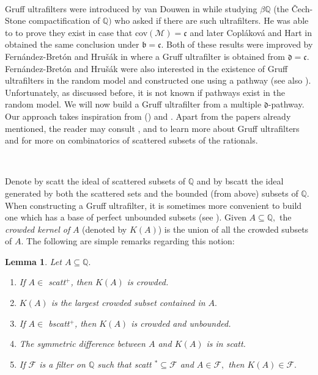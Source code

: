 \documentclass{article}%
\newtheorem{lemma}[theorem]{Lemma}
\begin{document}
\qquad\ \ \ 

Gruff ultrafilters were introduced by van Douwen in \cite{gruffvanDouwen}
while studying $\beta\mathbb{Q}$ (the \v{C}ech-Stone compactification of
$\mathbb{Q})$ who asked if there are such ultrafilters. He was able to to
prove they exist in case that \textsf{cov}$\left(  \mathcal{M}\right)
=\mathfrak{c}$ and later Copl\'{a}kov\'{a} and Hart in \cite{Hart} obtained
the same conclusion under $\mathfrak{b=c}.$ Both of these results were
improved by Fern\'{a}ndez-Bret\'{o}n and Hru\v{s}\'{a}k in
\cite{GruffUltrafilters} where a Gruff ultrafilter is obtained from
$\mathfrak{d=c}.$ Fern\'{a}ndez-Bret\'{o}n and Hru\v{s}\'{a}k were also
interested in the existence of Gruff ultrafilters in the random model and
constructed one using a pathway (see also \cite{GeneralizedPathways}).
Unfortunately, as discussed before, it is not known if pathways exist in the
random model. We will now build a Gruff ultrafilter from a multiple
$\mathfrak{d}$-pathway. Our approach takes inspiration from
\cite{GruffUltrafilters} (\cite{GeneralizedPathways}) and
\cite{PFiltersCohenRandomLaver}. Apart from the papers already mentioned, the
reader may consult \cite{GruffEmmanuel}, \cite{CPAbook} and \cite{GruffCPA} to
learn more about Gruff ultrafilters and \cite{irr} for more on combinatorics
of scattered subsets of the rationals.

\qquad\ \ \qquad\ \ 

Denote by \textsf{scatt }the ideal of scattered subsets of $\mathbb{Q}$ and by
\textsf{bscatt }the ideal generated by both the scattered sets and the bounded
(from above) subsets of $\mathbb{Q}.$ When constructing a Gruff ultrafilter,
it is sometimes more convenient to build one which has a base of perfect
unbounded subsets (see \cite{GruffUltrafilters}). Given $A\subseteq
\mathbb{Q},$ the \emph{crowded kernel of} $A$ (denoted by $K\left(  A\right)
$) is the union of all the crowded subsets of $A.$ The following are simple
remarks regarding this notion:

\begin{lemma}
Let $A\subseteq\mathbb{Q}.$ \label{prop basicas scatt}

\begin{enumerate}
\item If $A\in$ \textsf{scatt}$^{+}$, then $K\left(  A\right)  $ is crowded.

\item $K\left(  A\right)  $ is the largest crowded subset contained in $A.$

\item If $A\in$ \textsf{bscatt}$^{+}$, then $K\left(  A\right)  $ is crowded
and unbounded.

\item The symmetric difference between $A$ and $K\left(  A\right)  $ is in
\textsf{scatt.}

\item If $\mathcal{F}$ is a filter on $\mathbb{Q}$ such that \textsf{scatt}%
$^{\ast}\subseteq\mathcal{F}$ and $A\in\mathcal{F},$ then $K\left(  A\right)
\in\mathcal{F}.$
\end{enumerate}
\end{lemma}
\end{document}
